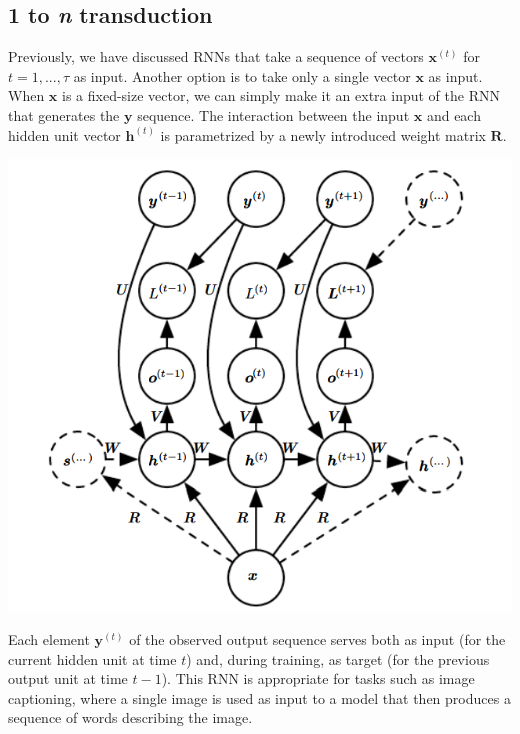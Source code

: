 \subsection{1 to \textit{n} transduction}
Previously, we have discussed RNNs that take a sequence of vectors $\textbf{x}^{(t)}$ for $t = 1, ..., \tau$ as input. Another option is to take only a single vector $\textbf{x}$ as input. When $\textbf{x}$ is a fixed-size vector, we can simply make it an extra input of the RNN
that generates the $\textbf{y}$ sequence.  The interaction between the input $\textbf{x}$ and each hidden unit vector $\textbf{h}^{(t)}$ is parametrized by a newly introduced weight matrix $\textbf{R}$.
\begin{center}
    \includegraphics[scale=0.8]{images/1-to-n transduction.png}
\end{center}
Each element $\textbf{y}^{(t)}$ of the observed output sequence serves both as input (for the current hidden unit at time $t$) and, during training, as target (for the previous output unit at time $t-1$).\newline\newline
This RNN is appropriate for tasks such as image captioning, where a single image is used as input to a model that then produces a sequence of words describing the image.

